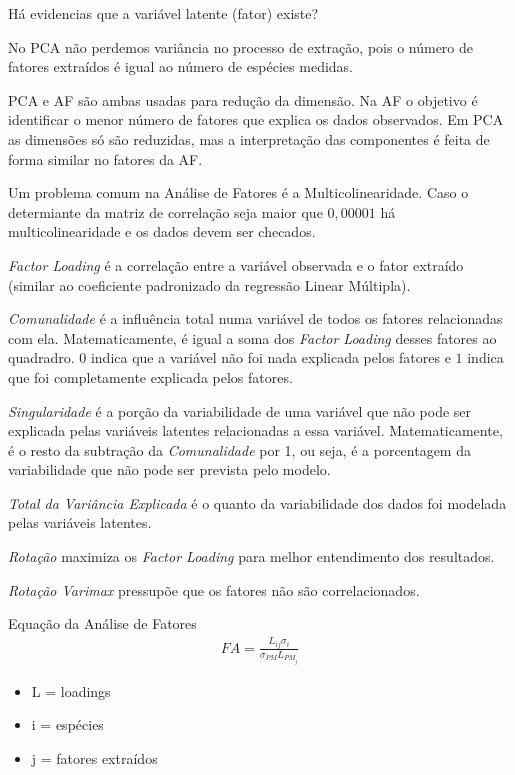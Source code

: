 Há evidencias que a variável latente (fator) existe?

No PCA não perdemos variância no processo de extração, pois 
o número de fatores extraídos é igual ao número de espécies medidas.

PCA e AF são ambas usadas para redução da dimensão. 
Na AF o objetivo é identificar o menor número de fatores que explica os 
dados observados. Em PCA as dimensões só são reduzidas, mas a 
interpretação das componentes é feita de forma similar no fatores da AF.

Um problema comum na Análise de Fatores é a Multicolinearidade. 
Caso o determiante da matriz de correlação seja maior que $0,00001$ 
há multicolinearidade e os dados devem ser checados. 

\textit{Factor Loading} é a correlação entre a variável observada e o fator
extraído (similar ao coeficiente padronizado da regressão Linear Múltipla). 

\textit{Comunalidade} é a influência total numa variável de todos os fatores 
relacionadas com ela. Matematicamente, é igual a soma dos \textit{Factor Loading}
desses fatores ao quadradro. 
$0$ indica que a variável não foi nada explicada pelos fatores e $1$ indica 
que foi completamente explicada pelos fatores. 

\textit{Singularidade} é a porção da variabilidade de uma variável que não 
pode ser explicada pelas variáveis latentes relacionadas a essa variável. 
Matematicamente, é o resto da subtração da \textit{Comunalidade} por 1,
ou seja, é a porcentagem da variabilidade que não pode ser prevista pelo modelo.

\textit{Total da Variância Explicada} é o quanto da variabilidade dos dados foi 
modelada pelas variáveis latentes. 

\textit{Rotação} maximiza os \textit{Factor Loading} para melhor 
entendimento dos resultados. 

\textit{Rotação Varimax} pressupõe que os fatores não são correlacionados.

Equação da Análise de Fatores
\begin{eqnarray}
FA = \frac{L_{ij}\sigma_i}{\sigma_{PM}L_{PM_j}}
\end{eqnarray}

\begin{itemize}
  \item L = loadings
  \item i = espécies
  \item j = fatores extraídos
\end{itemize}

